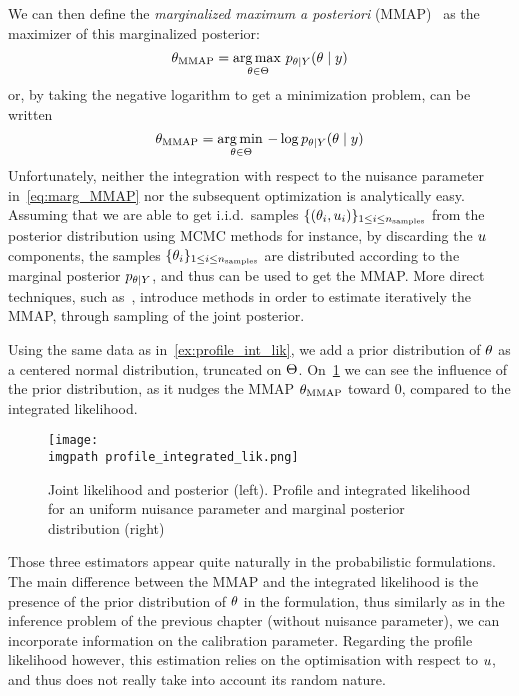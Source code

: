 \documentclass[../../Main_ManuscritThese.tex]{subfiles}
\newcommand\imgpath{/home/victor/acadwriting/Manuscrit/Text/Chapter3/img/}
\begin{document}
We can then define the \emph{marginalized maximum a posteriori} (MMAP)~\cite{doucet_marginal_2002} as the  maximizer of this marginalized posterior:
\begin{equation}
  \label{eq:def_MMAP}
  {\theta}_{\mathrm{MMAP}} = \operatorname*{arg\,max \,}_{\theta\in\Theta} p_{\theta \mid Y}(\theta\mid y)
\end{equation}
or, by taking the negative logarithm to get a minimization problem, can be written
\begin{equation}
{\theta}_{\mathrm{MMAP}} = \operatorname*{arg\,min \,}_{\theta\in\Theta} -\log  p_{\theta\mid Y}(\theta\mid y)
\end{equation}
Unfortunately, neither the integration with respect to the nuisance parameter in~\eqref{eq:marg_MMAP} nor the subsequent optimization is analytically easy.
Assuming that we are able to get i.i.d.\ samples $\{(\theta_i, u_i)\}_{1\leq i \leq n_{\mathrm{samples}}}$ from the posterior distribution using MCMC methods for instance, by discarding the $u$ components, the samples $\{\theta_i\}_{1 \leq i\leq n_{\mathrm{samples}}}$ are distributed according to the marginal posterior $p_{\theta \mid Y}$, and thus can be used to get the MMAP. More direct techniques, such as~\cite{doucet_marginal_2002}, introduce methods in order to estimate iteratively the MMAP, through sampling of the joint posterior.
\begin{example}
  Using the same data as in~\cref{ex:profile_int_lik}, we add a prior distribution of $\theta$ as a centered normal distribution, truncated on $\Theta$. On~\cref{fig:profile_integrated_lik} we can see the influence of the prior distribution, as it nudges the MMAP ${\theta}_{\mathrm{MMAP}}$ toward $0$, compared to the integrated likelihood.
\end{example}
\begin{figure}[ht]
  \centering
  \texttt{[image: \\imgpath profile\_integrated\_lik.png]}
  \caption[Joint likelihood and posterior distribution]{\label{fig:profile_integrated_lik} Joint likelihood and posterior (left). Profile and integrated likelihood for an uniform nuisance parameter and marginal posterior distribution (right)}
\end{figure}
Those three estimators appear quite naturally in the probabilistic
formulations. The main difference between the MMAP and the integrated
likelihood is the presence of the prior distribution of $\theta$ in the
formulation, thus similarly as in the inference problem of the
previous chapter (without nuisance parameter), we can incorporate
information on the calibration parameter. Regarding the profile
likelihood however, this estimation relies on the optimisation with
respect to $u$, and thus does not really take into account its
random nature.
\end{document}
